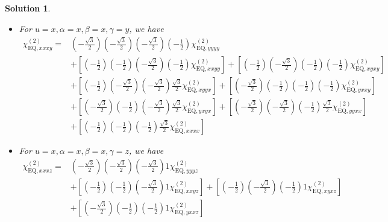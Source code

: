\documentclass[UTF8,10pt,a4paper]{article}
\theoremstyle{Problem}
\theoremstyle{Solution}
\newtheorem*{sol}{Solution}
\begin{document}
\begin{sol}
\begin{itemize}
\begin{align}
&+\left[\left(-\frac{1}{2}\right)\left(-\frac{1}{2}\right)\left(-\frac{1}{2}\right)\left(-\frac{1}{2}\right)\chi_{\text{EQ},xxxx}^{(2)}\right]
\end{align}\normalsize
\item For $u=x,\alpha=x,\beta=x,\gamma=y$, we have
\footnotesize\begin{align}
\nonumber\chi_{\text{EQ},xxxy}^{(2)}=&\left(-\frac{\sqrt{3}}{2}\right)\left(-\frac{\sqrt{3}}{2}\right)\left(-\frac{\sqrt{3}}{2}\right)\left(-\frac{1}{2}\right)\chi_{\text{EQ},yyyy}^{(2)}\\
\nonumber&+\left[\left(-\frac{1}{2}\right)\left(-\frac{1}{2}\right)\left(-\frac{\sqrt{3}}{2}\right)\left(-\frac{1}{2}\right)\chi_{\text{EQ},xxyy}^{(2)}\right]+\left[\left(-\frac{1}{2}\right)\left(-\frac{\sqrt{3}}{2}\right)\left(-\frac{1}{2}\right)\left(-\frac{1}{2}\right)\chi_{\text{EQ},xyxy}^{(2)}\right]\\
\nonumber&+\left[\left(-\frac{1}{2}\right)\left(-\frac{\sqrt{3}}{2}\right)\left(-\frac{\sqrt{3}}{2}\right)\frac{\sqrt{3}}{2}\chi_{\text{EQ},xyyx}^{(2)}\right]+\left[\left(-\frac{\sqrt{3}}{2}\right)\left(-\frac{1}{2}\right)\left(-\frac{1}{2}\right)\left(-\frac{1}{2}\right)\chi_{\text{EQ},yxxy}^{(2)}\right]\\
\nonumber&+\left[\left(-\frac{\sqrt{3}}{2}\right)\left(-\frac{1}{2}\right)\left(-\frac{\sqrt{3}}{2}\right)\frac{\sqrt{3}}{2}\chi_{\text{EQ},yxyx}^{(2)}\right]+\left[\left(-\frac{\sqrt{3}}{2}\right)\left(-\frac{\sqrt{3}}{2}\right)\left(-\frac{1}{2}\right)\frac{\sqrt{3}}{2}\chi_{\text{EQ},yyxx}^{(2)}\right]\\
&+\left[\left(-\frac{1}{2}\right)\left(-\frac{1}{2}\right)\left(-\frac{1}{2}\right)\frac{\sqrt{3}}{2}\chi_{\text{EQ},xxxx}^{(2)}\right]
\end{align}\normalsize
\item For $u=x,\alpha=x,\beta=x,\gamma=z$, we have
\footnotesize\begin{align}
\nonumber\chi_{\text{EQ},xxxz}^{(2)}=&\left(-\frac{\sqrt{3}}{2}\right)\left(-\frac{\sqrt{3}}{2}\right)\left(-\frac{\sqrt{3}}{2}\right)1\chi_{\text{EQ},yyyz}^{(2)}\\
\nonumber&+\left[\left(-\frac{1}{2}\right)\left(-\frac{1}{2}\right)\left(-\frac{\sqrt{3}}{2}\right)1\chi_{\text{EQ},xxyz}^{(2)}\right]+\left[\left(-\frac{1}{2}\right)\left(-\frac{\sqrt{3}}{2}\right)\left(-\frac{1}{2}\right)1\chi_{\text{EQ},xyxz}^{(2)}\right]\\
\nonumber&+\left[\left(-\frac{\sqrt{3}}{2}\right)\left(-\frac{1}{2}\right)\left(-\frac{1}{2}\right)1\chi_{\text{EQ},yxxz}^{(2)}\right]\\

\end{align}
\end{itemize}
\end{sol}
\end{document}
